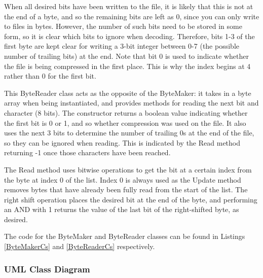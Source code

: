 \documentclass[../main.tex]{subfiles}
\begin{document}
When all desired bits have been written to the file, it is likely that this is not at the end of a byte, and so the remaining bits are left as 0, since you can only write to files in bytes. However, the number of such bits need to be stored in some form, so it is clear which bits to ignore when decoding. Therefore, bits 1-3 of the first byte are kept clear for writing a 3-bit integer between 0-7 (the possible number of trailing bits) at the end. Note that bit 0 is used to indicate whether the file is being compressed in the first place. This is why the index begins at 4 rather than 0 for the first bit.

\bigskip

\FloatBarrier

\FloatBarrier

This ByteReader class acts as the opposite of the ByteMaker: it takes in a byte array when being instantiated, and provides methods for reading the next bit and character (8 bits). The constructor returns a boolean value indicating whether the first bit is 0 or 1, and so whether compression was used on the file. It also uses the next 3 bits to determine the number of trailing 0s at the end of the file, so they can be ignored when reading. This is indicated by the Read method returning -1 once those characters have been reached.

The Read method uses bitwise operations to get the bit at a certain index from the byte at index 0 of the list. Index 0 is always used as the Update method removes bytes that have already been fully read from the start of the list. The right shift operation places the desired bit at the end of the byte, and performing an AND with 1 returns the value of the last bit of the right-shifted byte, as desired.

The code for the ByteMaker and ByteReader classes can be found in Listings \ref{ByteMakerCs} and \ref{ByteReaderCs} respectively.





\subsubsection{UML Class Diagram}
\end{document}
